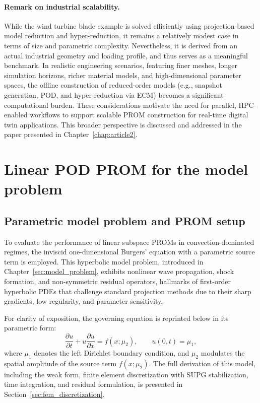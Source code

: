 \paragraph{Remark on industrial scalability.}
While the wind turbine blade example is solved efficiently using projection-based model reduction and hyper-reduction, it remains a relatively modest case in terms of size and parametric complexity. Nevertheless, it is derived from an actual industrial geometry and loading profile, and thus serves as a meaningful benchmark. In realistic engineering scenarios, featuring finer meshes, longer simulation horizons, richer material models, and high-dimensional parameter spaces, the offline construction of reduced-order models (e.g., snapshot generation, POD, and hyper-reduction via ECM) becomes a significant computational burden. These considerations motivate the need for parallel, HPC-enabled workflows to support scalable PROM construction for real-time digital twin applications. This broader perspective is discussed and addressed in the paper presented in Chapter~\ref{chap:article2}.

\section{Linear POD PROM for the model problem}
\label{sec:pod_prom_burgers}

\subsection{Parametric model problem and PROM setup}
\label{subsec:burgers_parametric_setup}

To evaluate the performance of linear subspace PROMs in convection-dominated regimes, the inviscid one-dimensional Burgers’ equation with a parametric source term is employed. This hyperbolic model problem, introduced in Chapter~\ref{sec:model_problem}, exhibits nonlinear wave propagation, shock formation, and non-symmetric residual operators, hallmarks of first-order hyperbolic PDEs that challenge standard projection methods due to their sharp gradients, low regularity, and parameter sensitivity.

For clarity of exposition, the governing equation is reprinted below in its parametric form:
\begin{equation}
\frac{\partial u}{\partial t} + u \frac{\partial u}{\partial x} = f(x; \mu_2),
\qquad
u(0, t) = \mu_1,
\label{eq:burgers_parametric}
\end{equation}
where \( \mu_1 \) denotes the left Dirichlet boundary condition, and \( \mu_2 \) modulates the spatial amplitude of the source term \( f(x; \mu_2) \). The full derivation of this model, including the weak form, finite element discretization with SUPG stabilization, time integration, and residual formulation, is presented in Section~\ref{sec:fem_discretization}.

